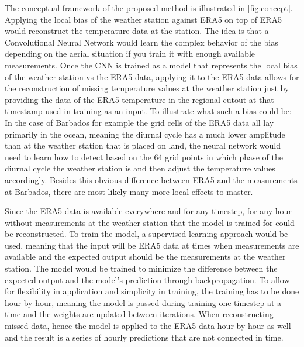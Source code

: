 The conceptual framework of the proposed method is illustrated in \autoref{fig:concept}. Applying the local bias of the weather station against ERA5 on top of ERA5 would reconstruct the temperature data at the station. The idea is that a Convolutional Neural Network would learn the complex behavior of the bias depending on the aerial situation if you train it with enough available measurements. Once the CNN is trained as a model that represents the local bias of the weather station vs the ERA5 data, applying it to the ERA5 data allows for the reconstruction of missing temperature values at the weather station just by providing the data of the ERA5 temperature in the regional cutout at that timestamp used in training as an input. To illustrate what such a bias could be: In the case of Barbados for example the grid cells of the ERA5 data all lay primarily in the ocean, meaning the diurnal cycle has a much lower amplitude than at the weather station that is placed on land, the neural network would need to learn how to detect based on the 64 grid points in which phase of the diurnal cycle the weather station is and then adjust the temperature values accordingly. Besides this obvious difference between ERA5 and the measurements at Barbados, there are most likely many more local effects to master.

Since the ERA5 data is available everywhere and for any timestep, for any hour without measurements at the weather station that the model is trained for could be reconstructed. To train the model, a supervised learning approach would be used, meaning that the input will be ERA5 data at times when measurements are available and the expected output should be the measurements at the weather station. The model would be trained to minimize the difference between the expected output and the model's prediction through backpropagation. To allow for flexibility in application and simplicity in training, the training has to be done hour by hour, meaning the model is passed during training one timestep at a time and the weights are updated between iterations. When reconstructing missed data, hence the model is applied to the ERA5 data hour by hour as well and the result is a series of hourly predictions that are not connected in time.


